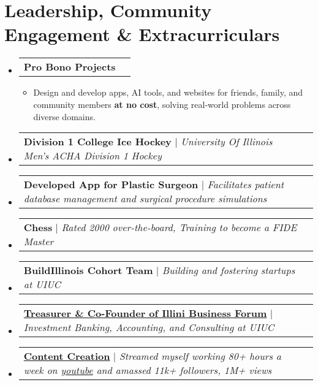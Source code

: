 \documentclass[letterpaper,10.99999999999999pt]{article}
\makeatletter
\newcommand{\resumeItem}[1]{
  \item\small{
    {#1 \vspace{-1pt}}
  }
}
\newcommand{\resumeProjectHeading}[2]{
    \item
    \begin{tabular*}{0.97\textwidth}{l@{\extracolsep{\fill}}r}
      \small#1 & #2 \\
    \end{tabular*}\vspace{-6pt}
}
\newcommand{\resumeSubHeadingListStart}{\begin{itemize}[leftmargin=0.15in, label={}]}
\newcommand{\resumeSubHeadingListEnd}{\end{itemize}}
\newcommand{\resumeItemListStart}{\begin{itemize}}
\newcommand{\resumeItemListEnd}{\end{itemize}\vspace{-5pt}}
\makeatother
\begin{document}
\section{Leadership, Community Engagement \& Extracurriculars}
  \resumeSubHeadingListStart
        \resumeProjectHeading
          {\textbf{Pro Bono Projects}}{}
          \resumeItemListStart
            \resumeItem{Design and develop apps, AI tools, and websites for friends, family, and community members \textbf{at no cost}, solving real-world problems across diverse domains.}
          \resumeItemListEnd
        \resumeProjectHeading
          {\textbf{Division 1 College Ice Hockey} $|$ \emph{University Of Illinois Men's ACHA Division 1 Hockey}}{}
        \resumeProjectHeading
          {\textbf{Developed App for Plastic Surgeon} $|$ \emph{Facilitates patient database management and surgical procedure simulations}}{}
        \resumeProjectHeading
          {\textbf{Chess} $|$ \emph{Rated 2000 over-the-board, Training to become a FIDE Master}}{}
        \resumeProjectHeading
          {\textbf{BuildIllinois Cohort Team} $|$ \emph{Building and fostering startups at UIUC}}{}
        \resumeProjectHeading
          {\textbf{\href{https://one.illinois.edu/illinibusinessforum/leadership-team/}{Treasurer \& Co-Founder of Illini Business Forum}} $|$ \emph{Investment Banking, Accounting, and Consulting at UIUC}}{}
        \resumeProjectHeading
          {\textbf{\href{https://www.youtube.com/@aidanandrews}{Content Creation}} $|$ \emph{Streamed myself working 80+ hours a week on \href{https://www.youtube.com/@aidanandrews}{youtube} and amassed 11k+ followers, 1M+ views}}{}
        
  \resumeSubHeadingListEnd
\end{document}
